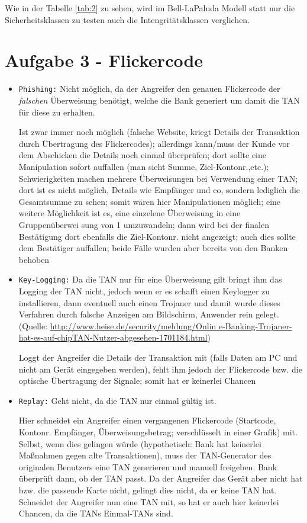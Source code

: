 \documentclass{scrartcl}
\begin{document}
Wie in der Tabelle \ref{tab:2} zu sehen, wird im Bell-LaPaluda Modell statt nur die Sicherheitsklassen zu testen auch die Intengritätsklassen verglichen.

\section*{Aufgabe 3 - Flickercode}

\begin{itemize}
\item \texttt{Phishing:} Nicht möglich, da der Angreifer den genauen Flickercode der \textit{falschen} Überweisung benötigt, welche die Bank generiert um damit die TAN für diese zu erhalten.  

Ist zwar immer noch möglich (falsche Website, kriegt Details der Transaktion durch Übertragung des Flickercodes);
allerdings kann/muss der Kunde vor dem Abschicken die Details noch einmal überprüfen; dort sollte eine Manipulation
sofort auffallen (man sieht Summe, Ziel-Kontonr.,etc.); Schwierigkeiten machen mehrere Überweisungen bei Verwendung
einer TAN; dort ist es nicht möglich, Details wie Empfänger und co, sondern lediglich die Gesamtsumme zu sehen; somit
wären hier Manipulationen möglich; eine weitere Möglichkeit ist es, eine einzelene Überweisung in eine Gruppenüberwei
sung von 1 umzuwandeln; dann wird bei der finalen Bestätigung dort ebenfalls die Ziel-Kontonr. nicht angezeigt; auch
dies sollte dem Bestätiger auffallen; beide Fälle wurden aber bereits von den Banken behoben

\item \texttt{Key-Logging:} Da die TAN nur für eine Überweisung gilt bringt ihm das Logging der TAN nicht, jedoch wenn
er es schafft einen Keylogger zu installieren, dann eventuell auch einen Trojaner und damit wurde dieses Verfahren
durch falsche Anzeigen am Bildschirm, Anwender rein gelegt. (Quelle: \url{http://www.heise.de/security/meldung/Onlin
e-Banking-Trojaner-hat-es-auf-chipTAN-Nutzer-abgesehen-1701184.html})

Loggt der Angreifer die Details der Transaktion mit (falls Daten am PC und nicht am Gerät eingegeben werden), fehlt ihm jedoch der Flickercode bzw. die optische Übertragung der Signale; somit hat er keinerlei Chancen

\item \texttt{Replay:} Geht nicht, da die TAN nur einmal gültig ist.

Hier schneidet ein Angreifer einen vergangenen Flickercode (Startcode, Kontonr. Empfänger, Überweisungsbetrag;
verschlüsselt in einer Grafik) mit. Selbst, wenn dies gelingen würde (hypothetisch: Bank hat keinerlei Maßnahmen gegen
alte Transaktionen), muss der TAN-Generator des originalen Benutzers eine TAN generieren und manuell freigeben. Bank
überprüft dann, ob der TAN passt. Da der Angreifer das Gerät aber nicht hat bzw. die passende Karte nicht, gelingt
dies nicht, da er keine TAN hat. 
Schneidet der Angreifer nun eine TAN mit, so hat er auch hier keinerlei Chancen, da die TANs Einmal-TANs sind.


\end{itemize}
\end{document}

